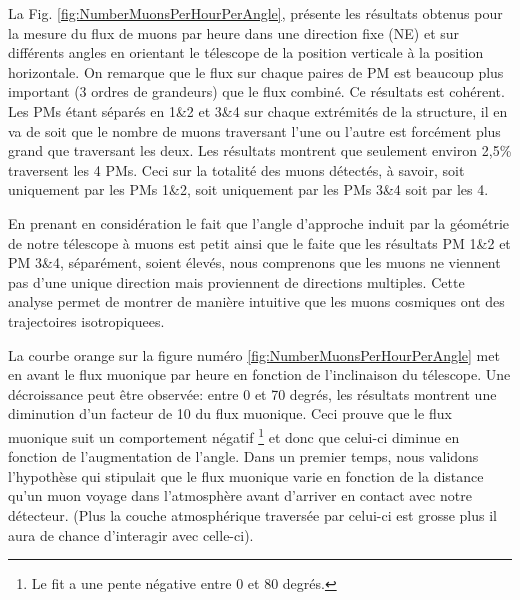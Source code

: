\documentclass[12pt]{article}
\begin{document}
La Fig. \ref{fig:NumberMuonsPerHourPerAngle}, présente les résultats obtenus pour la mesure du flux de muons par heure dans une direction fixe (NE) et sur différents angles en orientant le télescope de la position verticale à la position horizontale. On remarque que le flux sur chaque paires de PM est beaucoup plus important (3 ordres de grandeurs) que le flux combiné.
Ce résultats est cohérent. Les PMs étant séparés en 1\&2 et 3\&4 sur chaque extrémités de la structure, il en va de soit que le nombre de muons traversant l'une ou l'autre est forcément plus grand que traversant les deux. Les résultats montrent que seulement environ 2,5\% traversent les 4 PMs. Ceci sur la totalité des muons détectés, à savoir, soit uniquement par les PMs 1\&2, soit uniquement par les PMs 3\&4 soit par les 4.

En prenant en considération le fait que l'angle d'approche induit par la géométrie de notre télescope à muons est petit ainsi que le faite que les résultats PM 1\&2 et PM 3\&4, séparément, soient élevés, nous comprenons que les muons ne viennent pas d'une unique direction mais proviennent de directions multiples. Cette analyse permet de montrer de manière intuitive que les muons cosmiques ont des trajectoires isotropiquees.

La courbe orange sur la figure numéro \ref{fig:NumberMuonsPerHourPerAngle} met en avant le flux muonique par heure en fonction de l'inclinaison du télescope.
 Une décroissance peut être observée: entre 0 et 70 degrés, les résultats montrent une diminution d'un facteur de 10 du flux muonique. Ceci prouve que le flux muonique suit un comportement négatif \footnote{Le fit a une pente négative entre 0 et 80 degrés.} et donc que celui-ci diminue en fonction de l'augmentation de l'angle. Dans un premier temps, nous validons l'hypothèse qui stipulait que le flux muonique varie en fonction de la distance qu'un muon voyage dans l'atmosphère avant d'arriver en contact avec notre détecteur. (Plus la couche atmosphérique traversée par celui-ci est grosse plus il aura de chance d'interagir avec celle-ci). 
 
\end{document}
